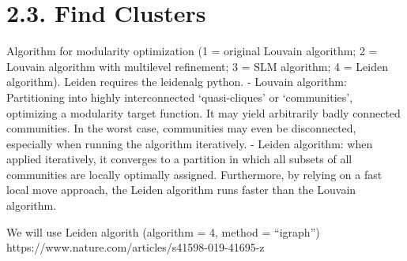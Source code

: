 \documentclass[
  letterpaper,
  DIV=11,
  numbers=noendperiod]{scrreprt}
\begin{document}
\section{2.3. Find Clusters}\label{find-clusters}

Algorithm for modularity optimization (1 = original Louvain algorithm; 2
= Louvain algorithm with multilevel refinement; 3 = SLM algorithm; 4 =
Leiden algorithm). Leiden requires the leidenalg python. - Louvain
algorithm: Partitioning into highly interconnected `quasi-cliques' or
`communities', optimizing a modularity target function. It may yield
arbitrarily badly connected communities. In the worst case, communities
may even be disconnected, especially when running the algorithm
iteratively. - Leiden algorithm: when applied iteratively, it converges
to a partition in which all subsets of all communities are locally
optimally assigned. Furthermore, by relying on a fast local move
approach, the Leiden algorithm runs faster than the Louvain algorithm.

We will use Leiden algorith (algorithm = 4, method = ``igraph'')
https://www.nature.com/articles/s41598-019-41695-z
\end{document}

